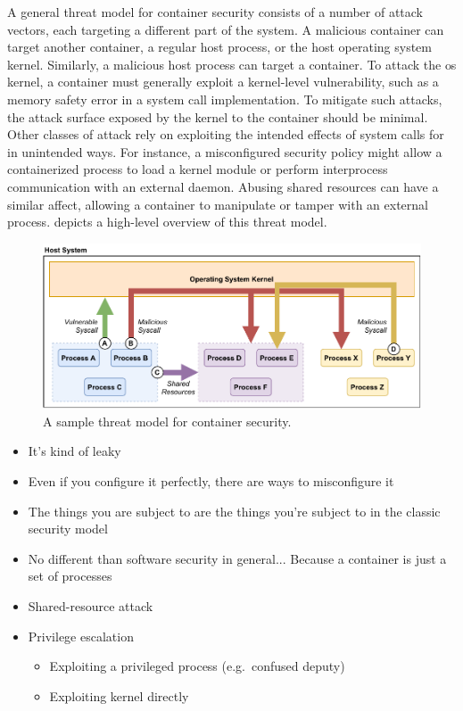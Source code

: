A general threat model for container security consists of a number of attack vectors, each
targeting a different part of the system. A malicious container can target another
container, a regular host process, or the host operating system kernel. Similarly,
a malicious host process can target a container. To attack the \gls{os} kernel,
a container must generally exploit a kernel-level vulnerability, such as a memory safety
error in a system call implementation. To mitigate such attacks, the attack surface
exposed by the kernel to the container should be minimal. Other classes of attack rely on
exploiting the intended effects of system calls for in unintended ways. For instance,
a misconfigured security policy might allow a containerized process to load a kernel
module or perform interprocess communication with an external daemon. Abusing shared
resources can have a similar affect, allowing a container to manipulate or tamper with an
external process.  depicts a high-level overview of this threat
model.

\begin{figure}[htbp]
  \centering
  \includegraphics[width=0.8\linewidth]{figs/background/container_security.pdf}
  \caption[A sample threat model for container security]{
    A sample threat model for container security.
  }%
  \label{fig:containersec}
\end{figure}

\begin{inprogress}
\begin{itemize}
  \item It's kind of leaky
  \item Even if you configure it perfectly, there are ways to misconfigure it
  \item The things you are subject to are the things you're subject to in the classic security model
  \item No different than software security in general... Because a container is just a set of processes
\end{itemize}
  \begin{itemize}
    \item Shared-resource attack
    \item Privilege escalation
    \begin{itemize}
      \item Exploiting a privileged process (e.g.~confused deputy)
      \item Exploiting kernel directly
    \end{itemize}
  \end{itemize}
\end{inprogress}

